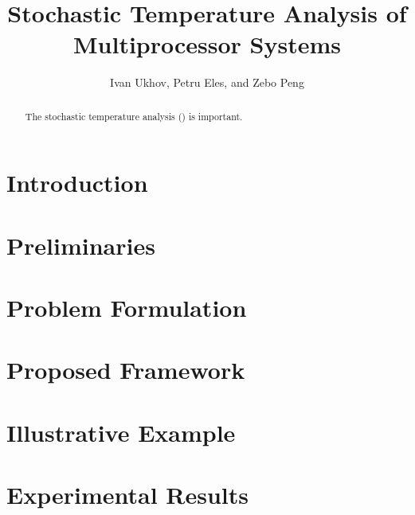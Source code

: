 \documentclass[conference]{IEEEtran}
\begin{document}
  \title{Stochastic Temperature Analysis of\\Multiprocessor Systems}
  \author{Ivan Ukhov, Petru Eles, and Zebo Peng}

  \author{
    \and
    \and
  }

  \maketitle

  \begin{abstract}
    The stochastic temperature analysis (\sta) is important.
  \end{abstract}

  \section{Introduction} 
  

  \section{Preliminaries}
  

  \section{Problem Formulation} 
  

  \section{Proposed Framework}
  

  \section{Illustrative Example} 
  

  \section{Experimental Results} 
  

  
  
\end{document}
